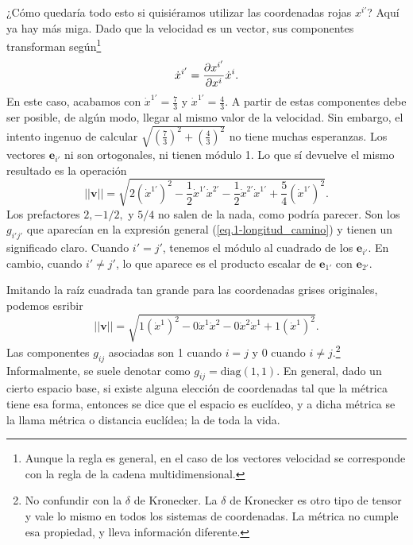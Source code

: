 \begin{example}
    ¿Cómo quedaría todo esto si quisiéramos utilizar las coordenadas rojas \(x^{i'}\)? Aquí ya hay más miga. Dado que la velocidad es un vector, sus componentes transforman según\footnote{Aunque la regla es general, en el caso de los vectores velocidad se corresponde con la regla de la cadena multidimensional.}
    \begin{equation}
        \dot{x}^{i'} = \frac{\partial x^{i'}}{\partial x^{i}} \dot{x}^{i}.
    \end{equation}
    En este caso, acabamos con \(\dot{x}^{1'} = \frac{7}{3}\) y \(\dot{x}^{1'} = \frac{4}{3}\). A partir de estas componentes debe ser posible, de algún modo, llegar al mismo valor de la velocidad. Sin embargo, el intento ingenuo de calcular \(\sqrt{\left(\frac{7}{3}\right)^2+\left(\frac{4}{3}\right)^2}\) no tiene muchas esperanzas. Los vectores \(\mathbf{e}_{i'}\) ni son ortogonales, ni tienen módulo 1. Lo que sí devuelve el mismo resultado es la operación
    \begin{equation*}
        ||\mathbf{v}|| = \sqrt{2\left(\dot{x}^{1'}\right)^2 - \frac{1}{2}\dot{x}^{1'}\dot{x}^{2'} - \frac{1}{2}\dot{x}^{2'}\dot{x}^{1'} + \frac{5}{4}\left(\dot{x}^{1'}\right)^2}.
    \end{equation*}
    Los prefactores \(2, -1/2,\) y \(5/4\) no salen de la nada, como podría parecer. Son los \(g_{i'j'}\) que aparecían en la expresión general (\cref{eq.1-longitud_camino}) y tienen un significado claro. Cuando \(i'=j'\), tenemos el módulo al cuadrado de los \(\mathbf{e}_{i'}\). En cambio, cuando \(i'\neq j'\), lo que aparece es el producto escalar de \(\mathbf{e}_{1'}\) con \(\mathbf{e}_{2'}\).
    
    Imitando la raíz cuadrada tan grande para las coordenadas grises originales, podemos esribir
    \begin{equation*}
        ||\mathbf{v}|| = \sqrt{1\left(\dot{x}^{1}\right)^2 - 0\dot{x}^{1}\dot{x}^{2} - 0\dot{x}^{2}\dot{x}^{1} + 1\left(\dot{x}^{1}\right)^2}.
    \end{equation*}
    Las componentes \(g_{ij}\) asociadas son 1 cuando \(i=j\) y \(0\) cuando \(i\neq j\).\footnote{No confundir con la \(\delta\) de Kronecker. La \(\delta\) de Kronecker es otro tipo de tensor y vale lo mismo en todos los sistemas de coordenadas. La métrica no cumple esa propiedad, y lleva información diferente.} Informalmente, se suele denotar como \(g_{ij} = \text{diag}(1, 1)\). En general, dado un cierto espacio base, si existe alguna elección de coordenadas tal que la métrica tiene esa forma, entonces se dice que el espacio es euclídeo, y a dicha métrica se la llama métrica o distancia euclídea; la de toda la vida.
\end{example}

